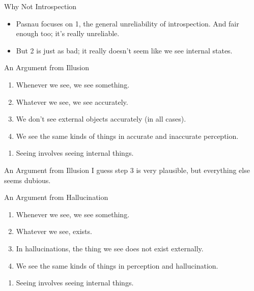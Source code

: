 \documentclass[
  17pt,
  letterpaper,
  ignorenonframetext,
  aspectratio=169,
]{beamer}
\providecommand{\tightlist}{%
  \setlength{\itemsep}{0pt}\setlength{\parskip}{0pt}}\usepackage{longtable,booktabs,array}
\begin{document}
\begin{frame}{Why Not Introspection}
\protect\hypertarget{why-not-introspection}{}
\begin{itemize}[<+->]
\tightlist
\item
  Pasnau focuses on 1, the general unreliability of introspection. And
  fair enough too; it's really unreliable.
\item
  But 2 is just as bad; it really doesn't seem like we see internal
  states.
\end{itemize}
\end{frame}

\begin{frame}{An Argument from Illusion}
\protect\hypertarget{an-argument-from-illusion}{}
\begin{enumerate}[<+->]
\tightlist
\item
  Whenever we see, we see something.
\item
  Whatever we see, we see accurately.
\item
  We don't see external objects accurately (in all cases).
\item
  We see the same kinds of things in accurate and inaccurate perception.
\end{enumerate}

\begin{enumerate}[<+->]
[A.]
\setcounter{enumi}{2}
\tightlist
\item
  Seeing involves seeing internal things.
\end{enumerate}
\end{frame}

\begin{frame}{An Argument from Illusion}
\protect\hypertarget{an-argument-from-illusion-1}{}
I guess step 3 is very plausible, but everything else seems dubious.
\end{frame}

\begin{frame}{An Argument from Hallucination}
\protect\hypertarget{an-argument-from-hallucination}{}
\begin{enumerate}[<+->]
\tightlist
\item
  Whenever we see, we see something.
\item
  Whatever we see, exists.
\item
  In hallucinations, the thing we see does not exist externally.
\item
  We see the same kinds of things in perception and hallucination.
\end{enumerate}

\begin{enumerate}[<+->]
[A.]
\setcounter{enumi}{2}
\tightlist
\item
  Seeing involves seeing internal things.
\end{enumerate}
\end{frame}
\end{document}
